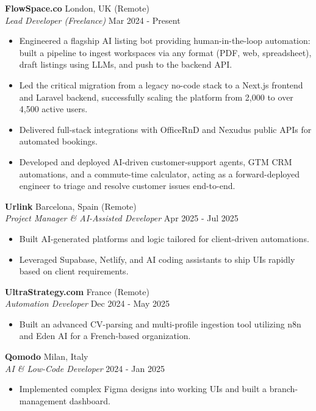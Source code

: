 \documentclass[11pt,a4paper]{article}
\begin{document}
\noindent
\textbf{FlowSpace.co} \hfill London, UK (Remote)\\
\textit{Lead Developer (Freelance)} \hfill Mar 2024 - Present
\begin{itemize}[leftmargin=*,noitemsep]
    \item Engineered a flagship AI listing bot providing human-in-the-loop automation: built a pipeline to ingest workspaces via any format (PDF, web, spreadsheet), draft listings using LLMs, and push to the backend API.
    \item Led the critical migration from a legacy no-code stack to a Next.js frontend and Laravel backend, successfully scaling the platform from 2,000 to over 4,500 active users.
    \item Delivered full-stack integrations with OfficeRnD and Nexudus public APIs for automated bookings.
    \item Developed and deployed AI-driven customer-support agents, GTM CRM automations, and a commute-time calculator, acting as a forward-deployed engineer to triage and resolve customer issues end-to-end.
\end{itemize}

\vspace{0.5em}
\noindent
\textbf{Urlink} \hfill Barcelona, Spain (Remote)\\
\textit{Project Manager \& AI-Assisted Developer} \hfill Apr 2025 - Jul 2025
\begin{itemize}[leftmargin=*,noitemsep]
    \item Built AI-generated platforms and logic tailored for client-driven automations.
    \item Leveraged Supabase, Netlify, and AI coding assistants to ship UIs rapidly based on client requirements.
\end{itemize}

\vspace{0.5em}
\noindent
\textbf{UltraStrategy.com} \hfill France (Remote)\\
\textit{Automation Developer} \hfill Dec 2024 - May 2025
\begin{itemize}[leftmargin=*,noitemsep]
    \item Built an advanced CV-parsing and multi-profile ingestion tool utilizing n8n and Eden AI for a French-based organization.
\end{itemize}

\vspace{0.5em}
\noindent
\textbf{Qomodo} \hfill Milan, Italy\\
\textit{AI \& Low-Code Developer} \hfill 2024 - Jan 2025
\begin{itemize}[leftmargin=*,noitemsep]
    \item Implemented complex Figma designs into working UIs and built a branch-management dashboard.
\end{itemize}
\end{document}
